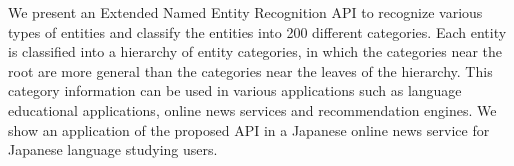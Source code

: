 We present an Extended Named Entity Recognition API to recognize various types of entities and classify the entities into 200 different categories. Each entity is classified into a hierarchy of entity categories, in which the categories near the root are more general than the categories near the leaves of the hierarchy. This category information can be used in various applications such as language educational applications, online news services and recommendation engines. We show an application of the proposed API in a Japanese online news service for Japanese language studying users.
